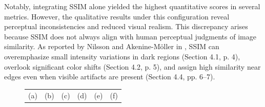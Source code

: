 Notably, integrating SSIM alone yielded the highest quantitative scores in several metrics. However, the qualitative results under this configuration reveal perceptual inconsistencies and reduced visual realism. This discrepancy arises because SSIM does not always align with human perceptual judgments of image similarity. As reported by Nilsson and Akenine-Möller in \cite{nvidia_Understanding_SSIM}, SSIM can overemphasize small intensity variations in dark regions (Section 4.1, p. 4), overlook significant color shifts (Section 4.2, p. 5), and assign high similarity near edges even when visible artifacts are present (Section 4.4, pp. 6–7).
\begin{figure}[!htbp]
    \centering
    \setlength{\tabcolsep}{2pt} %
    \renewcommand{\arraystretch}{1.0} %

    \begin{tabular}{*{6}{c}}
        (a) & (b) & (c) & (d) & (e) & (f) \\


\end{tabular}
\end{figure}
